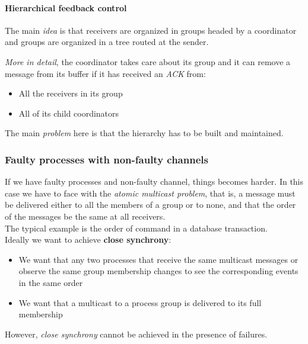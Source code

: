 \paragraph{Hierarchical feedback control}\label{hierarchical-feedback-control}

The main \textit{idea} is that receivers are organized in groups headed by a coordinator
and groups are organized in a tree routed at the sender.

\textit{More in detail}, the coordinator takes care about its group and it can remove a message
from its buffer if it has received an \textit{ACK} from:

\begin{itemize}
\itemsep1pt\parskip0pt
\item
  All the receivers in its group
\item
  All of its child coordinators
\end{itemize}

The main \textit{problem} here is that the hierarchy has to be built and maintained.

\subsubsection{Faulty processes with non-faulty
channels}\label{faulty-processes-with-non-faulty-channels}

If we have faulty processes and non-faulty channel, things becomes harder. In this case we have to face with the \emph{atomic multicast problem}, that is, a message must be delivered either to all the members of a group or to none, and that the order of the messages be the same at all receivers.\\
The typical example is the order of command in a database transaction.\\
Ideally we want to achieve \textbf{close synchrony}:

\begin{itemize}
\itemsep1pt\parskip0pt
\item
  We want that any two processes that receive the same multicast
  messages or observe the same group membership changes to see the
  corresponding events in the same order
\item
  We want that a multicast to a process group is delivered to its full
  membership
\end{itemize}
However, \textit{close synchrony} cannot be achieved in the presence of failures.

